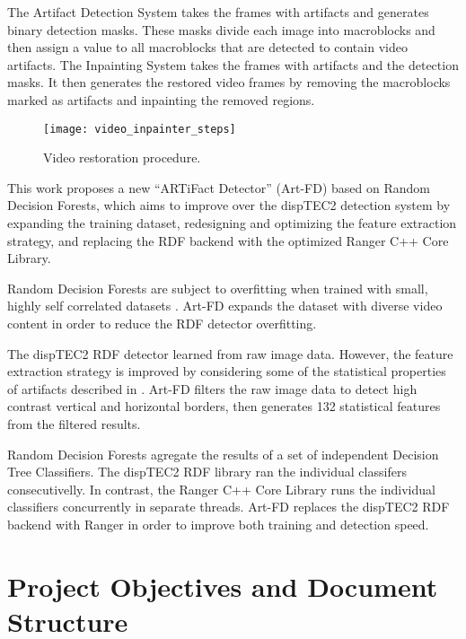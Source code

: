 The Artifact Detection System takes the frames with artifacts and generates binary detection masks. These masks divide each image into macroblocks and then assign a value to all macroblocks that are detected to contain video artifacts. The Inpainting System takes the frames with artifacts and the detection masks. It then generates the restored video frames by removing the macroblocks marked as artifacts and inpainting the removed regions.

\begin{figure} [!h]
  \centering
  
  \texttt{[image: video\_inpainter\_steps]}
  
  \caption{Video restoration procedure. }
  \label{fig:restoration_system_steps}

\end{figure}

This work proposes a new ``ARTiFact Detector'' (Art-FD) based on Random Decision Forests, which aims to improve over the dispTEC2 detection system by expanding the training dataset, redesigning and optimizing the feature extraction strategy, and replacing the RDF backend with the optimized Ranger C++ Core Library.

Random Decision Forests are subject to overfitting when trained with small, highly self correlated datasets \cite{Breiman2001}. Art-FD expands the dataset with diverse video content in order to reduce the RDF detector overfitting.

The dispTEC2 RDF detector learned from raw image data. However, the feature extraction strategy is improved by considering some of the statistical properties of artifacts described in \cite{Vranjes2019, Glavota2018}. Art-FD filters the raw image data to detect high contrast vertical and horizontal borders, then generates 132 statistical features from the filtered results.

Random Decision Forests agregate the results of a set of independent Decision Tree Classifiers. The dispTEC2 RDF library ran the individual classifers consecutivelly. In contrast, the Ranger C++ Core Library runs the individual classifiers concurrently in separate threads. Art-FD replaces the dispTEC2 RDF backend with Ranger in order to improve both training and detection speed.

\section{Project Objectives and Document Structure}
\label{sec:intro_objectives}

